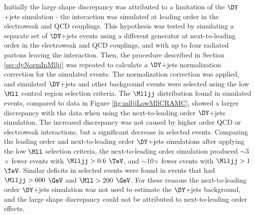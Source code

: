 Initially the large shape discrepancy was attributed to a limitation of the $\DY$+jets simulation - the \DY interaction was simulated 
at leading order in the electroweak and QCD couplings.  This hypothesis was tested by simulating a separate set of 
$\DY$+jets events using a different \MC generator at next-to-leading order in the electroweak and QCD couplings, and with up to four 
radiated partons leaving the \DY interaction.  Then, the procedure described in Section \ref{sec:dyNormInMlljj} was repeated to 
calculate a $\DY$+jets normalization correction for the simulated \DY events.  The normalization correction was applied, and 
simulated $\DY$+jets and other background events were selected using the low $\Mll$ control region selection criteria.  The $\Mlljj$ 
distribution found in simulated events, compared to data in Figure \ref{fig:mlljjLowMllCRAMC}, showed a larger discrepancy with the data 
when using the next-to-leading order $\DY$+jets simulation.  The increased discrepancy was not caused by 
higher order QCD or electroweak interactions, but a significant decrease in selected events.  Comparing the leading order 
and next-to-leading order $\DY$+jets simulations after applying the low $\Mll$ selection criteria, the next-to-leading order simulation 
produced $\sim$3$\times$ fewer events with $\Mlljj > 0.6$ $\TeV$, and $\sim$10$\times$ fewer events with $\Mlljj > 1$ $\TeV$.  Similar 
deficits in selected events were found in events that had $\Mlljj > 600$ $\GeV$ and $\Mll > 200$ $\GeV$.  For these reasons the 
next-to-leading order $\DY$+jets simulation was not used to estimate the $\DY$+jets background, and the large shape discrepancy could not 
be attributed to next-to-leading order effects.

